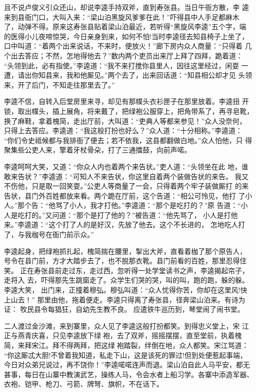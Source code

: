 且不说卢俊义引众还山，却说李逵手持双斧，直到寿张县。当日午衙方散，李
逵来到县衙门口，大叫入来：“梁山泊黑旋风爹爹在此！”吓得县中人手足都麻木
了，动弹不得。原来这寿张县贴着梁山泊最近，若听得“黑旋风李逵”五个字，端
的医得小儿夜啼惊哭，今日亲身到来，如何不怕!当时李逵径去知县椅子上坐了，
口中叫道：“着两个出来说话，不来时，便放火！”廊下房内众人商量：“只得着
几个出去答应；不然，怎地得他去？”数内两个吏员出来厅上拜了四拜，跪着道：
“头领到此，必有指使。”李逵道：“我不来打搅你县里人，因往这里经过，闲耍
一遭，请出你知县来，我和他厮见。”两个去了，出来回话道：“知县相公却才见
头领来，开了后门，不知走往那里去了。”

李逵不信，自转入后堂房里来寻，却见有那幞头衣衫匣子在那里放着。李逵扭
开锁，取出幞头，插上展角，将来戴了，把绿袍公服穿上，把角带系了，再寻皂靴，
换了麻鞋，拿着槐简，走出厅前，大叫道：“吏典人等都来参见！”众人没奈何，
只得上去答应。李逵道：“我这般打扮也好么？”众人道：“十分相称。”李逵道：
“你们令史祗候都与我排衙了便去；若不依我，这县都翻做白地。”众人怕他，只
得聚集些公吏人来，擎着牙杖骨朵，打了三通擂鼓，向前声喏。

李逵呵呵大笑，又道：“你众人内也着两个来告状。”吏人道：“头领坐在此
地，谁敢来告状？”李逵道：“可知人不来告状，你这里自着两个装做告状的来告。
我又不伤他，只是取一回笑耍。”公吏人等商量了一会，只得着两个牢子装做厮打
的来告状，县门外百姓都放来看。两个跪在厅前，这个告道：“相公可怜见，他打
了小人。”那个告：“他骂了小人，我才打他。”李逵道：“那个是吃打的？”原
告道：“小人是吃打的。”又问道：“那个是打了他的？”被告道：“他先骂了，
小人是打他来。”李逵道：“这个打了人的是好汉，先放了他去。这个不长进的，
怎地吃人打了，与我枷号在衙门前示众。”

李逵起身，把绿袍抓扎起，槐简揣在腰里，掣出大斧，直看着枷了那个原告人，
号令在县门前，方才大踏步去了，也不脱那衣靴。县门前看的百姓，那里忍得住笑。
正在寿张县前走过东，走过西，忽听得一处学堂读书之声，李逵揭起帘子，走将入
去，吓得那先生跳窗走了。众学生们哭的哭，叫的叫，跑的跑，躲的躲。李逵大笑，
出门来，正撞着穆弘。穆弘叫道：“众人忧得你苦，你却在这里风!快上山去！”
那里由他，拖着便走。李逵只得离了寿张县，径奔梁山泊来。有诗为证：
牧民县令每猖狂，自幼先生教不良。
应遣铁牛巡历到，琴堂闹了闹书堂。

二人渡过金沙滩，来到寨里，众人见了李逵这般打扮都笑。到得忠义堂上，宋
江正与燕青庆喜，只见李逵放下绿袍，去了双斧，摇摇摆摆，直至堂前，执着槐
简，来拜宋江。拜不得两拜，把这绿袍踏裂，绊倒在地，众人都笑。宋江骂道：
“你这厮忒大胆!不曾着我知道，私走下山，这是该死的罪过!但到处便惹起事端，
今日对众弟兄说过，再不饶你！”李逵喏喏连声而退。梁山泊自此人马平安，都无
甚事，每日在山寨中教演武艺，操练人马，令会水者上船习学。各寨中添造军器、
衣袍、铠甲、枪刀、弓箭、牌弩、旗帜，不在话下。

